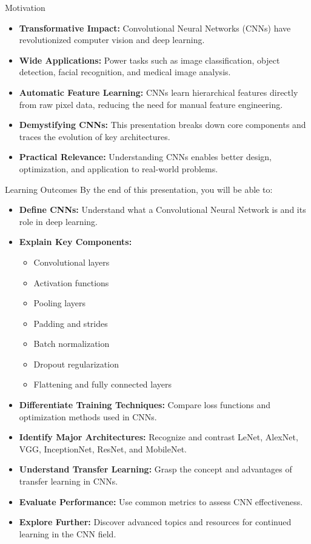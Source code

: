\begin{frame}{Motivation}
    \begin{itemize}
        \item \textbf{Transformative Impact:} Convolutional Neural Networks (CNNs) have revolutionized computer vision and deep learning.
        \item \textbf{Wide Applications:} Power tasks such as image classification, object detection, facial recognition, and medical image analysis.
        \item \textbf{Automatic Feature Learning:} CNNs learn hierarchical features directly from raw pixel data, reducing the need for manual feature engineering.
        \item \textbf{Demystifying CNNs:} This presentation breaks down core components and traces the evolution of key architectures.
        \item \textbf{Practical Relevance:} Understanding CNNs enables better design, optimization, and application to real-world problems.
    \end{itemize}
\end{frame}

\begin{frame}[allowframebreaks]{Learning Outcomes}
    By the end of this presentation, you will be able to:
    \begin{itemize}
        \item \textbf{Define CNNs:} Understand what a Convolutional Neural Network is and its role in deep learning.
        \item \textbf{Explain Key Components:}
        \begin{itemize}
            \item Convolutional layers
            \item Activation functions
            \item Pooling layers
            \item Padding and strides
            \item Batch normalization
            \item Dropout regularization
            \item Flattening and fully connected layers
        \end{itemize}
        \item \textbf{Differentiate Training Techniques:} Compare loss functions and optimization methods used in CNNs.
        \item \textbf{Identify Major Architectures:} Recognize and contrast LeNet, AlexNet, VGG, InceptionNet, ResNet, and MobileNet.
        \item \textbf{Understand Transfer Learning:} Grasp the concept and advantages of transfer learning in CNNs.
        \item \textbf{Evaluate Performance:} Use common metrics to assess CNN effectiveness.
        \item \textbf{Explore Further:} Discover advanced topics and resources for continued learning in the CNN field.
    \end{itemize}
\end{frame}